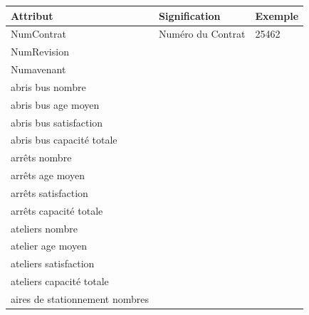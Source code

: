 \documentclass[a4paper]{report}
\begin{document}
\begin{doublespace}
	\begin{table}[H]
		\begin{center}
			\begin{tabularx}{17.5cm}{|X|p{3cm}|p{1.5cm}|}
				\hline
				\textbf{Attribut}                      & \textbf{Signification} & \textbf{Exemple} \\
				\hline
				NumContrat                             & Numéro du Contrat      & 25462            \\
				\hline
				NumRevision                            &                        &                  \\
				\hline
				Numavenant                             &                        &                  \\
				\hline
				abris bus nombre                       &                        &                  \\
				\hline
				abris bus age moyen                    &                        &                  \\
				\hline
				abris bus satisfaction                 &                        &                  \\
				\hline
				abris bus capacité totale              &                        &                  \\
				\hline
				arrêts nombre                          &                        &                  \\
				\hline
				arrêts age moyen                       &                        &                  \\
				\hline
				arrêts satisfaction                    &                        &                  \\
				\hline
				arrêts capacité totale                 &                        &                  \\
				\hline
				ateliers nombre                        &                        &                  \\
				\hline
				atelier age moyen                      &                        &                  \\
				\hline
				ateliers satisfaction                  &                        &                  \\
				\hline
				ateliers capacité totale               &                        &                  \\
				\hline
				aires de stationnement nombres         &                        &                  \\

\end{tabularx}
\end{center}
\end{table}
\end{doublespace}
\end{document}
